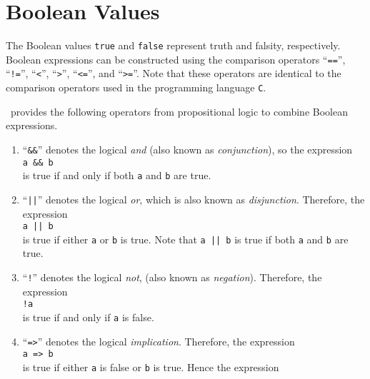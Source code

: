 \section{Boolean Values}
The Boolean values \texttt{true} and \texttt{false} represent truth and falsity, respectively.  Boolean
expressions can be constructed using the comparison operators ``\texttt{==}'', 
``\texttt{!=}'', ``\texttt{<}'',  ``\texttt{>}'', ``\texttt{<=}'', and ``\texttt{>=}''.
Note that these operators are identical to the comparison operators used in the programming language
\texttt{C}.

 \setlx\
provides the following operators from propositional logic to combine Boolean expressions.
\begin{enumerate}
\item ``\texttt{\&\&}'' denotes the logical \emph{and} (also known as \emph{conjunction}), so the expression
      \\[0.2cm]
      \hspace*{1.3cm}
      \texttt{a \&\& b}
      \\[0.2cm]
      is true if and only if both \texttt{a} and \texttt{b} are true.
\item ``\texttt{||}'' denotes the logical \emph{or}, which is also known as \emph{disjunction}.
      Therefore,  the expression
      \\[0.2cm]
      \hspace*{1.3cm}
      \texttt{a || b}
      \\[0.2cm]
      is true if either \texttt{a} or \texttt{b} is true.  Note that 
      \texttt{a || b} is true if both \texttt{a} and \texttt{b} are
      true.
\item ``\texttt{!}'' denotes the logical \emph{not}, (also known as \emph{negation}).
      Therefore, the expression
      \\[0.2cm]
      \hspace*{1.3cm}
      \texttt{!a}
      \\[0.2cm]
      is true if and only if \texttt{a} is false.  
\item ``\texttt{=>}'' denotes the logical \emph{implication}.
      Therefore, the expression
      \\[0.2cm]
      \hspace*{1.3cm}
      \texttt{a => b}
      \\[0.2cm]
      is true if either \texttt{a} is false or \texttt{b} is true. Hence the expression 
      \\[0.2cm]
      \hspace*{1.3cm}

\end{enumerate}
